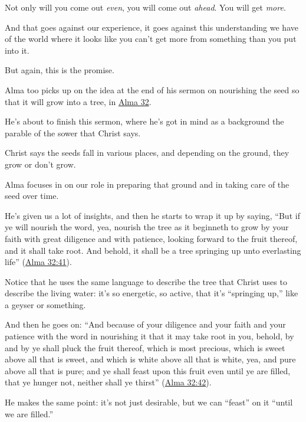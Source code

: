 \begin{compactitem}
\begin{compactitem}
\begin{compactitem}
							\item Not only will you come out \textit{even}, you will come out \textit{ahead}. You will get \textit{more}. 
							\item And that goes against our experience, it goes against this understanding we have of the world where it looks like you can't get more from something than you put into it. 
							\item But again, this is the promise.
						\end{compactitem}
					\item Alma too picks up on the idea at the end of his sermon on nourishing the seed so that it will grow into a tree, in \hyperref[ALMA-32]{Alma 32}.
						\begin{compactitem}
							\item He's about to finish this sermon, where he's got in mind as a background the parable of the sower that Christ says.
							\item Christ says the seeds fall in various places, and depending on the ground, they grow or don't grow.
							\item Alma focuses in on our role in preparing that ground and in taking care of the seed over time. 
							\item He's given us a lot of insights, and then he starts to wrap it up by saying, ``But if ye will nourish the word, yea, nourish the tree as it beginneth to grow by your faith with great diligence and with patience, looking forward to the fruit thereof, and it shall take root. And behold, it shall be a tree springing up unto everlasting life'' (\hyperref[ALMA-32-41]{Alma 32:41}).
							\item Notice that he uses the same language to describe the tree that Christ uses to describe the living water: it's so energetic, so active, that it's ``springing up,'' like a geyser or something.
							\item And then he goes on: ``And because of your diligence and your faith and your patience with the word in nourishing it that it may take root in you, behold, by and by ye shall pluck the fruit thereof, which is most precious, which is sweet above all that is sweet, and which is white above all that is white, yea, and pure above all that is pure; and ye shall feast upon this fruit even until ye are filled, that ye hunger not, neither shall ye thirst'' (\hyperref[ALMA-32-42]{Alma 32:42}).
							\item He makes the same point: it's not just desirable, but we can ``feast'' on it ``until we are filled.'' 

\end{compactitem}
\end{compactitem}
\end{compactitem}
